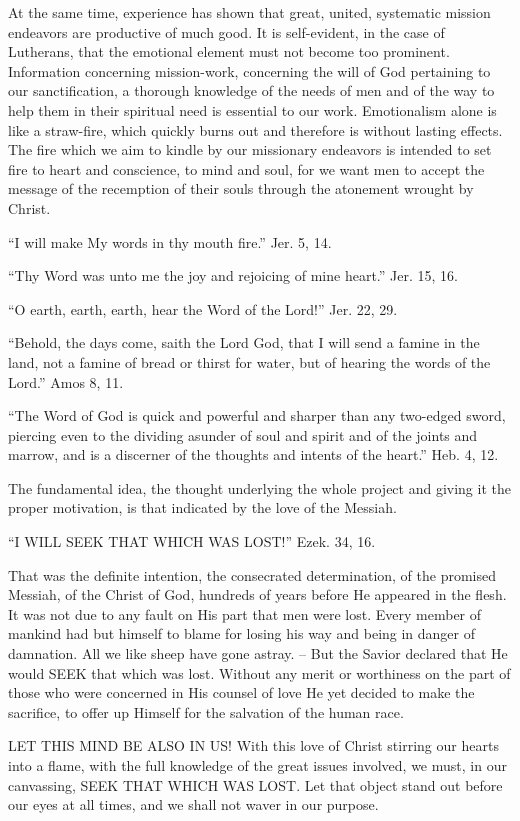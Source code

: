 \documentclass[
]{book}
\begin{document}
At the same time, experience has shown that great, united, systematic mission endeavors are productive of much good. It is self-evident, in the case of Lutherans, that the emotional element must not become too prominent. Information concerning mission-work, concerning the will of God pertaining to our sanctification, a thorough knowledge of the needs of men and of the way to help them in their spiritual need is essential to our work. Emotionalism alone is like a straw-fire, which quickly burns out and therefore is without lasting effects. The fire which we aim to kindle by our missionary endeavors is intended to set fire to heart and conscience, to mind and soul, for we want men to accept the message of the recemption of their souls through the atonement wrought by Christ.

``I will make My words in thy mouth fire.'' Jer. 5, 14.

``Thy Word was unto me the joy and rejoicing of mine heart.'' Jer. 15, 16.

``O earth, earth, earth, hear the Word of the Lord!'' Jer. 22, 29.

``Behold, the days come, saith the Lord God, that I will send a famine in the land, not a famine of bread or thirst for water, but of hearing the words of the Lord.'' Amos 8, 11.

``The Word of God is quick and powerful and sharper than any two-edged sword, piercing even to the dividing asunder of soul and spirit and of the joints and marrow, and is a discerner of the thoughts and intents of the heart.'' Heb. 4, 12.

The fundamental idea, the thought underlying the whole project and giving it the proper motivation, is that indicated by the love of the Messiah.

``I WILL SEEK THAT WHICH WAS LOST!'' Ezek. 34, 16.

That was the definite intention, the consecrated determination, of the promised Messiah, of the Christ of God, hundreds of years before He appeared in the flesh. It was not due to any fault on His part that men were lost. Every member of mankind had but himself to blame for losing his way and being in danger of damnation. All we like sheep have gone astray. -- But the Savior declared that He would SEEK that which was lost. Without any merit or worthiness on the part of those who were concerned in His counsel of love He yet decided to make the sacrifice, to offer up Himself for the salvation of the human race.

LET THIS MIND BE ALSO IN US! With this love of Christ stirring our hearts into a flame, with the full knowledge of the great issues involved, we must, in our canvassing, SEEK THAT WHICH WAS LOST. Let that object stand out before our eyes at all times, and we shall not waver in our purpose.
\end{document}
